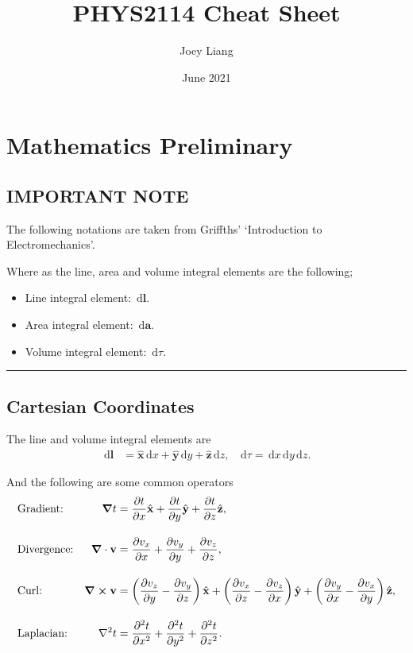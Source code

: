 \documentclass[12pt,english]{article}
\title{PHYS2114 Cheat Sheet}
\date{June 2021}
\author{Joey Liang}
\newcommand{\dmr}[1]{\, \mathrm{d}#1} %
\numberwithin{equation}{subsection}
\let\oldhat\hat
\renewcommand{\vec}[1]{\mathbf{#1}}
\renewcommand{\hat}[1]{\oldhat{\mathbf{#1}}}
\begin{document}
\maketitle
\newpage
\tableofcontents
\newpage
\section{Mathematics Preliminary}
\subsection{IMPORTANT NOTE}
The following notations are taken from Griffths' `Introduction to Electromechanics'.\cite{Griffiths:611579}

Where as the line, area and volume integral elements are the following;
\begin{itemize}
    \item Line integral element: $\dmr{\vec{l}}.$
    \item Area integral element: $\dmr{\vec{a}}.$ 
    \item Volume integral element: $\dmr{\tau}.$
\end{itemize}

\par\noindent\rule{\textwidth}{0.4pt}

\subsection{Cartesian Coordinates}
The line and volume integral elements are
\begin{align*}
    \dmr{\vec{l}} &= \hat{x}\dmr{x} + \hat{y}\dmr{y} + \hat{z}\dmr{z}, & \dmr{\tau} = \dmr{x}\dmr{y}\dmr{z}.
\end{align*}

And the following are some common operators
\begin{align*}
    &\text{Gradient:} &\grad t  &= \pdv{t}{x}\hat{x} + \pdv{t}{y}\hat{y} + \pdv{t}{z}\hat{z},\\[1em]
    &\text{Divergence:} &\grad\cdot\vec{v} &= \pdv{v_x}{x} + \pdv{v_y}{y} + \pdv{v_z}{z},\\[1em]
    &\text{Curl:} &\grad \cross \vec{v} &= \left(\pdv{v_z}{y}-\pdv{v_y}{z}\right)\hat{x} + \left(\pdv{v_x}{z}-\pdv{v_z}{x}\right)\hat{y} + \left(\pdv{v_y}{x}-\pdv{v_x}{y}\right)\hat{z},\\[1em]
    &\text{Laplacian:} &\laplacian t &= \pdv[2]{t}{x} + \pdv[2]{t}{y} +\pdv[2]{t}{z}. 
\end{align*}
\end{document}
